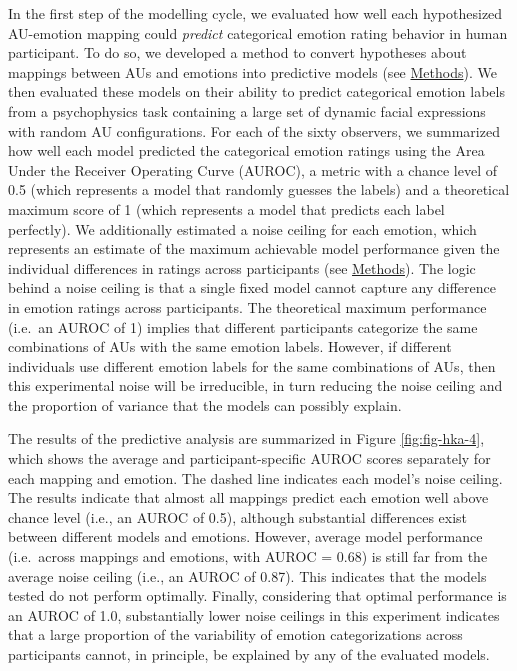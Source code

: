 \documentclass[12pt,american,a4paper,oneside,]{memoir} %
\begin{document}
In the first step of the modelling cycle, we evaluated how well each hypothesized AU-emotion mapping could \emph{predict} categorical emotion rating behavior in human participant. To do so, we developed a method to convert hypotheses about mappings between AUs and emotions into predictive models (see \protect\hyperlink{hka-methods}{Methods}). We then evaluated these models on their ability to predict categorical emotion labels from a psychophysics task containing a large set of dynamic facial expressions with random AU configurations. For each of the sixty observers, we summarized how well each model predicted the categorical emotion ratings using the Area Under the Receiver Operating Curve (AUROC), a metric with a chance level of 0.5 (which represents a model that randomly guesses the labels) and a theoretical maximum score of 1 (which represents a model that predicts each label perfectly). We additionally estimated a noise ceiling for each emotion, which represents an estimate of the maximum achievable model performance given the individual differences in ratings across participants (see \protect\hyperlink{methods}{Methods}). The logic behind a noise ceiling is that a single fixed model cannot capture any difference in emotion ratings across participants. The theoretical maximum performance (i.e.~an AUROC of 1) implies that different participants categorize the same combinations of AUs with the same emotion labels. However, if different individuals use different emotion labels for the same combinations of AUs, then this experimental noise will be irreducible, in turn reducing the noise ceiling and the proportion of variance that the models can possibly explain.

The results of the predictive analysis are summarized in Figure \ref{fig:fig-hka-4}, which shows the average and participant-specific AUROC scores separately for each mapping and emotion. The dashed line indicates each model's noise ceiling. The results indicate that almost all mappings predict each emotion well above chance level (i.e., an AUROC of 0.5), although substantial differences exist between different models and emotions. However, average model performance (i.e.~across mappings and emotions, with AUROC = 0.68) is still far from the average noise ceiling (i.e., an AUROC of 0.87). This indicates that the models tested do not perform optimally. Finally, considering that optimal performance is an AUROC of 1.0, substantially lower noise ceilings in this experiment indicates that a large proportion of the variability of emotion categorizations across participants cannot, in principle, be explained by any of the evaluated models.
\end{document}
